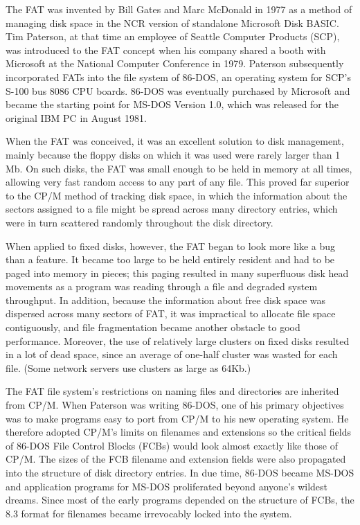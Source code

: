 The FAT was invented by Bill Gates and Marc McDonald in 1977 as a method of
managing disk space in the NCR version of standalone Microsoft Disk BASIC.
Tim Paterson, at that time an employee of Seattle Computer Products
(SCP), was introduced to the FAT concept when his company shared a booth with
Microsoft at the National Computer Conference in 1979.  Paterson subsequently
incorporated FATs into the file system of 86-DOS, an operating system for
SCP's S-100 bus 8086 CPU boards.  86-DOS was eventually purchased by
Microsoft and became the starting point for MS-DOS Version 1.0, which was
released for the original IBM PC in August 1981.
 
When the FAT was conceived, it was an excellent solution to disk management,
mainly because the floppy disks on which it was used were rarely larger than
1 Mb.  On such disks, the FAT was small enough to be held in memory at all
times, allowing very fast random access to any part of any file.  This proved
far superior to the CP/M method of tracking disk space, in which the
information about the sectors assigned to a file might be spread across many
directory entries, which were in turn scattered randomly throughout the disk
directory.
 
When applied to fixed disks, however, the FAT began to look more like a bug
than a feature.  It became too large to be held entirely resident and had to
be paged into memory in pieces; this paging resulted in many superfluous disk
head movements as a program was reading through a file and degraded system
throughput.  In addition, because the information about free disk space was
dispersed across many sectors of FAT, it was impractical to allocate file
space contiguously, and file fragmentation became another obstacle to good
performance.  Moreover, the use of relatively large clusters on fixed disks
resulted in a lot of dead space, since an average of one-half cluster was
wasted for each file.  (Some network servers use clusters as large as 64Kb.)
 
The FAT file system's restrictions on naming files and directories are
inherited from CP/M. When Paterson was writing 86-DOS, one of his primary
objectives was to make programs easy to port from CP/M to his new operating
system.  He therefore adopted CP/M's limits on filenames and extensions so
the critical fields of 86-DOS File Control Blocks (FCBs) would look almost
exactly like those of CP/M.  The sizes of the FCB filename and extension
fields were also propagated into the structure of disk directory entries. In
due time, 86-DOS became MS-DOS and application programs for MS-DOS
proliferated beyond anyone's wildest dreams.  Since most of the early
programs depended on the structure of FCBs, the 8.3 format for filenames
became irrevocably locked into the system.
 
